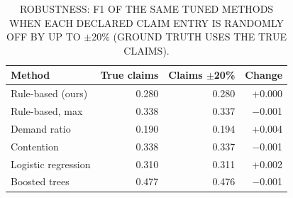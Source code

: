 \begin{table}[t]
\centering
\footnotesize
\caption{ROBUSTNESS: F1 OF THE SAME TUNED METHODS WHEN EACH DECLARED CLAIM ENTRY IS RANDOMLY OFF BY UP TO $\pm$20\% (GROUND TRUTH USES THE TRUE CLAIMS).}
\label{tab:robust}
\begin{tabular}{lrrr}
\toprule
Method & True claims & Claims $\pm$20\% & Change \\
\midrule
Rule-based (ours) & 0.280 & 0.280 & +0.000 \\
Rule-based, max & 0.338 & 0.337 & $-$0.001 \\
Demand ratio & 0.190 & 0.194 & +0.004 \\
Contention & 0.338 & 0.337 & $-$0.001 \\
Logistic regression & 0.310 & 0.311 & +0.002 \\
Boosted trees & 0.477 & 0.476 & $-$0.001 \\
\bottomrule
\end{tabular}
\end{table}
